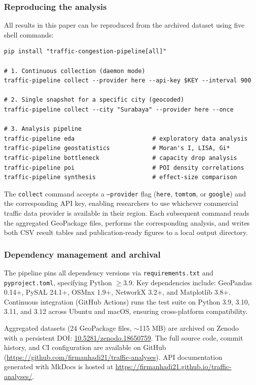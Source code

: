 \documentclass[preprint,12pt,authoryear]{elsarticle}
\begin{document}
\subsubsection{Reproducing the analysis}

All results in this paper can be reproduced from the archived dataset using five shell commands:

\begin{verbatim}
pip install "traffic-congestion-pipeline[all]"

# 1. Continuous collection (daemon mode)
traffic-pipeline collect --provider here --api-key $KEY --interval 900

# 2. Single snapshot for a specific city (geocoded)
traffic-pipeline collect --city "Surabaya" --provider here --once

# 3. Analysis pipeline
traffic-pipeline eda                      # exploratory data analysis
traffic-pipeline geostatistics            # Moran's I, LISA, Gi*
traffic-pipeline bottleneck               # capacity drop analysis
traffic-pipeline poi                      # POI density correlations
traffic-pipeline synthesis                # effect-size comparison
\end{verbatim}

\noindent The \texttt{collect} command accepts a \texttt{--provider} flag (\texttt{here}, \texttt{tomtom}, or \texttt{google}) and the corresponding API key, enabling researchers to use whichever commercial traffic data provider is available in their region. Each subsequent command reads the aggregated GeoPackage files, performs the corresponding analysis, and writes both CSV result tables and publication-ready figures to a local output directory.

\subsubsection{Dependency management and archival}

The pipeline pins all dependency versions via \texttt{requirements.txt} and \texttt{pyproject.toml}, specifying Python $\geq$3.9. Key dependencies include: GeoPandas 0.14+, PySAL 24.1+, OSMnx 1.9+, NetworkX 3.2+, and Matplotlib 3.8+. Continuous integration (GitHub Actions) runs the test suite on Python 3.9, 3.10, 3.11, and 3.12 across Ubuntu and macOS, ensuring cross-platform compatibility.

Aggregated datasets (24 GeoPackage files, $\sim$115 MB) are archived on Zenodo with a persistent DOI: \href{https://doi.org/10.5281/zenodo.18650759}{10.5281/zenodo.18650759}. The full source code, commit history, and CI configuration are available on GitHub (\url{https://github.com/firmanhadi21/traffic-analyses}). API documentation generated with MkDocs is hosted at \url{https://firmanhadi21.github.io/traffic-analyses/}.
\end{document}
